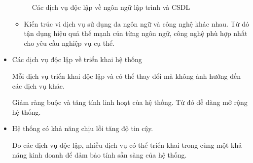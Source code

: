 \begin{itemize}
\begin{figure}[H]
\caption{Các dịch vụ độc lập về ngôn ngữ lập trình và CSDL}

\end{figure}

\begin{itemize}

\item Kiến trúc vi dịch vụ sử dụng đa ngôn ngữ và công nghệ khác nhau. Từ đó tận dụng hiệu quả thế mạnh của từng ngôn ngữ, công nghệ phù hợp nhất cho yêu cầu nghiệp vụ cụ thể.

\end{itemize}

\item Các dịch vụ độc lập về triển khai hệ thống

Mỗi dịch vụ triển khai độc lập và có thể thay đổi mà không ảnh hưởng đến các dịch vụ khác.

Giảm ràng buộc và tăng tính linh hoạt của hệ thống. Từ đó dễ dàng mở rộng hệ thống.

\item Hệ thống có khả năng chịu lỗi tăng độ tin cậy.

Do các dịch vụ độc lập, nhiều dịch vụ có thể triển khai trong cùng một khả năng kinh doanh để đảm bảo tính sẵn sàng của hệ thống.

\end{itemize}